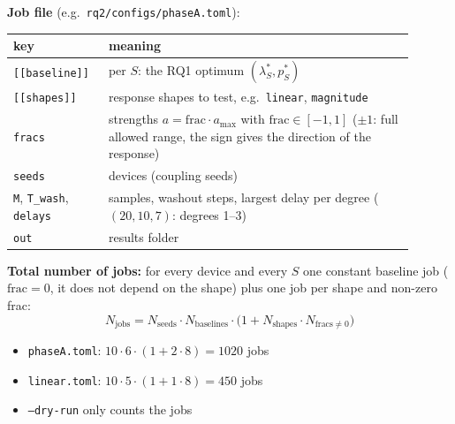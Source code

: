 \textbf{Job file} (e.g.\ \texttt{rq2/configs/phaseA.toml}):
\begin{center}
\begin{tabular}{p{0.2\linewidth}p{0.7\linewidth}}
    \hline
    key & meaning \\
    \hline
    \texttt{[[baseline]]} & per $S$: the RQ1 optimum $(\lambda^*_S, p^*_S)$ \\
    \texttt{[[shapes]]} & response shapes to test, e.g.\ \texttt{linear}, \texttt{magnitude} \\
    \texttt{fracs} & strengths $a = \text{frac} \cdot a_{\max}$ with $\text{frac} \in [-1, 1]$ ($\pm 1$: full allowed
    range, the sign gives the direction of the response) \\
    \texttt{seeds} & devices (coupling seeds) \\
    \texttt{M}, \texttt{T\_wash}, \texttt{delays} & samples, washout steps, largest delay per degree
    ($(20, 10, 7)$: degrees 1--3) \\
    \texttt{out} & results folder \\
    \hline
\end{tabular}
\end{center}

\textbf{Total number of jobs:} for every device and every $S$ one constant baseline job ($\text{frac} = 0$, it does
not depend on the shape) plus one job per shape and non-zero frac:
\begin{equation*}
    N_{\text{jobs}} = N_{\text{seeds}} \cdot N_{\text{baselines}} \cdot \big(1 + N_{\text{shapes}} \cdot N_{\text{fracs} \neq 0}\big)
\end{equation*}
\begin{itemize}
    \item \texttt{phaseA.toml}: $10 \cdot 6 \cdot (1 + 2 \cdot 8) = 1020$ jobs
    \item \texttt{linear.toml}: $10 \cdot 5 \cdot (1 + 1 \cdot 8) = 450$ jobs
    \item \texttt{--dry-run} only counts the jobs
\end{itemize}

